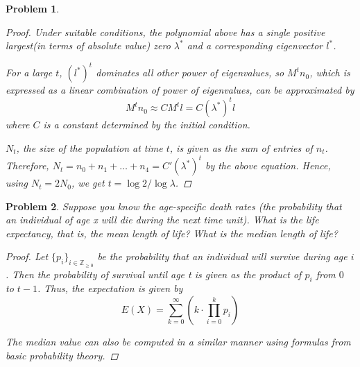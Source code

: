 \documentclass[12pt]{report}
\newtheorem{problem}{Problem}[chapter]
\begin{document}
\begin{problem}
\begin{proof}
        Under suitable conditions, the polynomial above has a single positive largest(in terms of absolute value) zero $\lambda^*$ and a corresponding eigenvector $l^*$.

        For a large $t$, $({l^*})^t$ dominates all other power of eigenvalues, so $M^t n_0$, which is expressed as a linear combination of power of eigenvalues, can be approximated by
        \begin{equation*}
            M^{t} n_0 \approx C M^{t} l = C {(\lambda^*)}^t l
        \end{equation*}
        where $C$ is a constant determined by the initial condition.

        $N_t$, the size of the population at time $t$, is given as the sum of entries of $n_t$.
        Therefore, $N_t = n_0 + n_1 + \ldots + n_4 = C' (\lambda^*)^t$ by the above equation.
        Hence, using $N_t = 2N_0$, we get $t = \log{2}/\log{\lambda}$.
    \end{proof}
\end{problem}

\begin{problem}
    Suppose you know the age-specific death rates (the probability that an individual of age x will die during the next time unit). What is the life expectancy, that is, the mean length of life? What is the median length of life?

    \begin{proof}
        Let $\{p_i\}_{i \in \mathbb{Z}_{\geq 0}}$ be the probability that an individual will survive during age $i$.
        Then the probability of survival until age t is given as the product of $p_i$ from $0$ to $t-1$.
        Thus, the expectation is given by
        \begin{equation*}
            E(X) = \sum_{k=0}^{\infty} \left( k \cdot \prod_{i=0}^{k}p_i \right)
        \end{equation*}

        The median value can also be computed in a similar manner using formulas from basic probability theory.
    \end{proof}
\end{problem}
\end{document}
